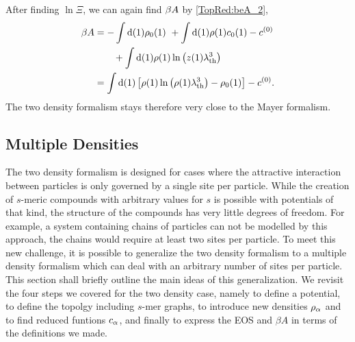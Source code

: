 \documentclass[8.5pt,twoside,twocolumn]{article}
\newcommand\di{\te{d}}
\newcommand\cze{\enmat{c^{(0)}}}
\newcommand\lath{\enmat{\la_\te{th}}}
\newcommand\roz{\enmat{\rho_0}}
\newcommand\ral{\enmat{\rho_{\al}}}
\newcommand\calp{\enmat{c_{\al}}}
\theoremstyle{standard}
\begin{document}
After finding $\ln\Xi$, we can again find $\beta A$ by \eqref{TopRed:beA_2},
\begin{equation}
\begin{aligned}
\be A &= -\int \di(1) \roz(1)\ + \int \di(1) \rho(1)c_0(1) - \cze \\
&\qquad + \int \di(1) \rho(1) \ln \lt(z(1) \lath^3\rt)  \\
&= \int \di(1) \lt[ \rho(1)\ln\lt(\rho(1)\lath^3\rt) - \roz(1)\rt] - \cze.
\end{aligned}
\label{WH:beA} 
\end{equation}
The two density formalism stays therefore very close to the Mayer formalism.  

\subsection{Multiple Densities}

The two density formalism is designed for cases where the attractive interaction between
particles is only governed by a single site per particle. While the creation of $s$-meric
compounds with arbitrary values for $s$ is possible with potentials of that kind, the structure
of the compounds has very little degrees of freedom. For example, a system containing chains
of particles can not be modelled by this approach, the chains would require at
least two sites per particle. To meet this new challenge, it is possible to generalize
the two density formalism to a multiple density formalism which can deal with an arbitrary
number of sites per particle. This section shall briefly outline the main ideas
of this generalization. We revisit the four steps we covered for the two density case,
namely to define a potential, to define the topolgy including $s$-mer graphs, to
introduce new densities $\ral$ and to find reduced funtions $\calp$, and finally to express
the EOS and $\beta A$ in terms of the definitions we made.
\end{document}
